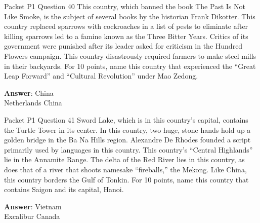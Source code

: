 \begin{frame}{Packet P1 Question 40}
This country, which banned the book The Past Is Not Like Smoke,   is the subject of   several books by the historian Frank Dikotter. This country   replaced sparrows with cockroaches in a list of pests to eliminate after killing   sparrows led to a famine known as the Three Bitter Years. Critics of its government were punished after its leader asked for criticism in the Hundred Flowers campaign. This country disastrously required farmers to make steel mills in their backyards. For 10 points, name this country that experienced the “Great Leap Forward” and “Cultural Revolution” under Mao Zedong.  

\textbf{Answer}: China\\
 Netherlands
 China
\end{frame}

\begin{frame}{Packet P1 Question 41}
Sword Lake, which is in   this country's capital, contains the Turtle Tower in its center. In this country, two huge, stone hands hold up a golden bridge in the Ba Na Hills region. Alexandre De Rhodes founded a script primarily used by languages   in this country. This   country's ``Central Highlands'' lie in the Annamite Range. The delta of the Red   River lies in this country, as does that of a river that shoots namesake ``fireballs,'' the Mekong. Like China, this country borders the Gulf of Tonkin. For 10 points, name this country that contains Saigon and its capital, Hanoi.  

\textbf{Answer}: Vietnam\\
 Excalibur
 Canada
\end{frame}

